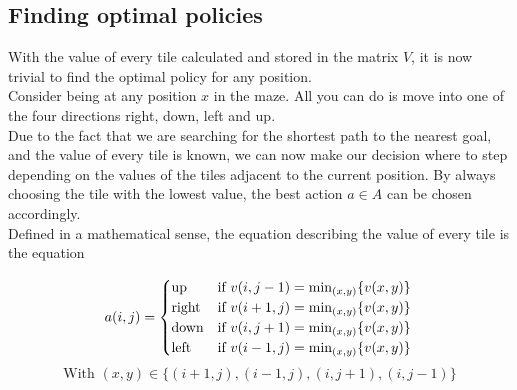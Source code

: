 \documentclass[conference]{IEEEtran}
\begin{document}
\subsection{Finding optimal policies}
With the value of every tile calculated and stored in the matrix $V$, it is now trivial to find the optimal policy for any position.\\
Consider being at any position $x$ in the maze. All you can do is move into one of the four directions right, down, left and up. \\
Due to the fact that we are searching for the shortest path to the nearest goal, and the value of every tile is known, we can now make our decision where to step depending on the values of the tiles adjacent to the current position. By always choosing the tile with the lowest value, the best action $a \in A$ can be chosen accordingly.\\
Defined in a mathematical sense, the equation describing the value of every tile is the equation 

\begin{small}
\begin{equation} 
\label{policy}
a(i,j)=
	\begin{cases}
		\text{up} & \text{if } v(i,j-1) = \min_{(x,y)} \{v(x,y)\} \\
		\text{right} & \text{if } v(i+1,j) = \min_{(x,y)} \{v(x,y)\} \\
		\text{down} & \text{if } v(i,j+1) = \min_{(x,y)} \{v(x,y)\} \\
		\text{left} & \text{if } v(i-1,j) = \min_{(x,y)} \{v(x,y)\} \\
	\end{cases} \\
\end{equation}
\begin{equation*}
\text{With } (x,y) \in \{(i+1,j),(i-1,j),(i,j+1),(i,j-1)\}
\end{equation*}
\end{small}
\end{document}
